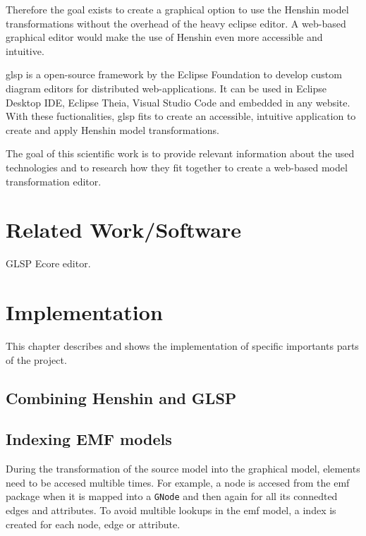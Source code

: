 \documentclass[conference,onecolumn]{IEEEtran}
\newcommand{\code}[1]{\texttt{#1}}
\begin{document}
  Therefore the goal exists to create a graphical option to use the Henshin model transformations without the overhead of the heavy eclipse editor. A web-based graphical editor would make the use of Henshin even more accessible and intuitive.

  \ac{glsp} is a open-source framework by the Eclipse Foundation to develop custom diagram editors for distributed web-applications. \cite{glsp-repo} It can be used in Eclipse Desktop IDE, Eclipse Theia, Visual Studio Code and embedded in any website. With these fuctionalities, \ac{glsp} fits to create an accessible, intuitive application to create and apply Henshin model transformations.

  The goal of this scientific work is to provide relevant information about the used technologies and to research how they fit together to create a web-based model transformation editor.

  

  \section{Related Work/Software}
  \label{sec:related-work}

  GLSP Ecore editor.



  \section{Implementation}
  \label{subsec:implementation}
  This chapter describes and shows the implementation of specific importants parts of the project. 

  \subsection{Combining Henshin and GLSP}
  \label{subsec:henshin-glsp}

  \subsection{Indexing EMF models}
  \label{subsec:indexing}
  During the transformation of the source model into the graphical model, elements need to be accesed multible times. For example, a node is accesed from the \ac{emf} package when it is mapped into a \code{GNode} and then again for all its connedted edges and attributes. To avoid multible lookups in the \ac{emf} model, a index is created for each node, edge or attribute.
\end{document}
